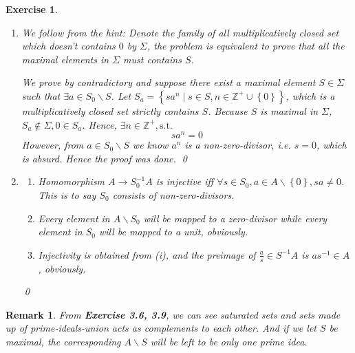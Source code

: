 \documentclass{article}
\theoremstyle{breakstyle}
\newtheorem{exercise}{Exercise}
\newtheorem{remark}{Remark}
\begin{document}
\begin{exercise}
    \leavevmode \vspace{-\baselineskip}
    \begin{enumerate}[label=({\Roman*})]
        \item 
            We follow from the hint:
            Denote the family of all multiplicatively closed set which doesn't contains $0$ by $\Sigma$,
            the problem is equivalent to prove that all the maximal elements in $\Sigma$ must contains $S$.

            We prove by contradictory and suppose there exist a maximal element $S\in \Sigma$ such that $\exists a \in S_0\backslash S$.
            Let $S_{a}=\left\{ sa^{n}\mid s \in S,n \in \mathbb{Z}^{+}\cup \left\{ 0 \right\}  \right\} $, which is a multiplicatively closed set strictly contains $S$.
            Because $S$ is maximal in $\Sigma$, $S_{a}\not\in \Sigma,0\in S_{a}$.
            Hence, $\exists n \in \mathbb{Z}^{+},\text{s.t. }$
            $$
            sa^{n}=0
            $$
            However, from $a\in S_0\backslash S$ we know $a^{n}$ is a non-zero-divisor, i.e. $s=0$, which is absurd.
            Hence the proof was done.
            \qed
        \item 
            \begin{enumerate}[label=({\roman*})]
                \item 
                    Homomorphism $A\longrightarrow S_0^{-1}A$ is injective iff $\forall s \in S_0,a\in A\backslash \left\{ 0 \right\} ,sa\neq 0$.
                    This is to say $S_0$ consists of non-zero-divisors.
                \item 
                    Every element in $A\backslash S_0$ will be mapped to a zero-divisor while every element in $S_0$ will be mapped to a unit, obviously.
                \item 
                    Injectivity is obtained from \emph{(i)}, and the preimage of $\frac{a}{s}\in S^{-1}A$ is $as^{-1}\in A$, obviously.
            \end{enumerate}
            \qed
    \end{enumerate}
\end{exercise}

\begin{remark}
    From \textbf{Exercise 3.6, 3.9}, we can see saturated sets and sets made up of prime-ideals-union acts as complements to each other.
    And if we let $S$ be maximal, the corresponding $A\backslash S$ will be left to be only one prime idea.
\end{remark}
\end{document}
